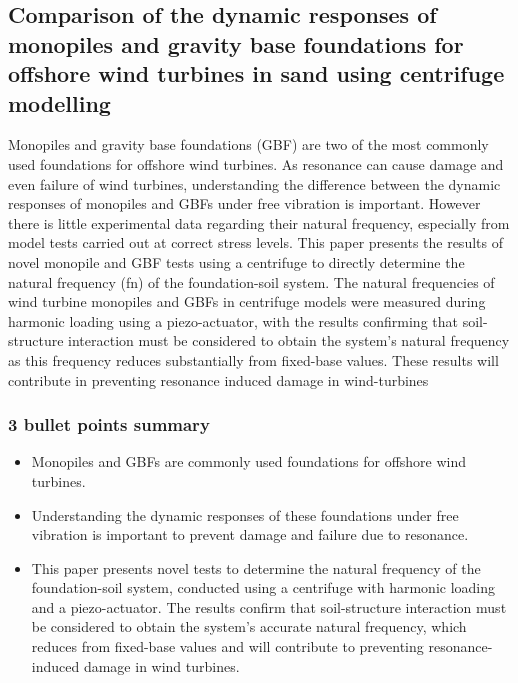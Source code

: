 \documentclass[
  letterpaper,
  DIV=11,
  numbers=noendperiod]{scrreprt}
\providecommand{\tightlist}{%
  \setlength{\itemsep}{0pt}\setlength{\parskip}{0pt}}\usepackage{longtable,booktabs,array}
\begin{document}
\hypertarget{comparison-of-the-dynamic-responses-of-monopiles-and-gravity-base-foundations-for-offshore-wind-turbines-in-sand-using-centrifuge-modelling}{%
\subsection{Comparison of the dynamic responses of monopiles and gravity
base foundations for offshore wind turbines in sand using centrifuge
modelling}\label{comparison-of-the-dynamic-responses-of-monopiles-and-gravity-base-foundations-for-offshore-wind-turbines-in-sand-using-centrifuge-modelling}}

Monopiles and gravity base foundations (GBF) are two of the most
commonly used foundations for offshore wind turbines. As resonance can
cause damage and even failure of wind turbines, understanding the
difference between the dynamic responses of monopiles and GBFs under
free vibration is important. However there is little experimental data
regarding their natural frequency, especially from model tests carried
out at correct stress levels. This paper presents the results of novel
monopile and GBF tests using a centrifuge to directly determine the
natural frequency (fn) of the foundation-soil system. The natural
frequencies of wind turbine monopiles and GBFs in centrifuge models were
measured during harmonic loading using a piezo-actuator, with the
results confirming that soil-structure interaction must be considered to
obtain the system's natural frequency as this frequency reduces
substantially from fixed-base values. These results will contribute in
preventing resonance induced damage in wind-turbines

\hypertarget{bullet-points-summary}{%
\subsubsection{3 bullet points summary}\label{bullet-points-summary}}

\begin{itemize}
\tightlist
\item
  Monopiles and GBFs are commonly used foundations for offshore wind
  turbines.
\item
  Understanding the dynamic responses of these foundations under free
  vibration is important to prevent damage and failure due to resonance.
\item
  This paper presents novel tests to determine the natural frequency of
  the foundation-soil system, conducted using a centrifuge with harmonic
  loading and a piezo-actuator. The results confirm that soil-structure
  interaction must be considered to obtain the system's accurate natural
  frequency, which reduces from fixed-base values and will contribute to
  preventing resonance-induced damage in wind turbines.
\end{itemize}
\end{document}
